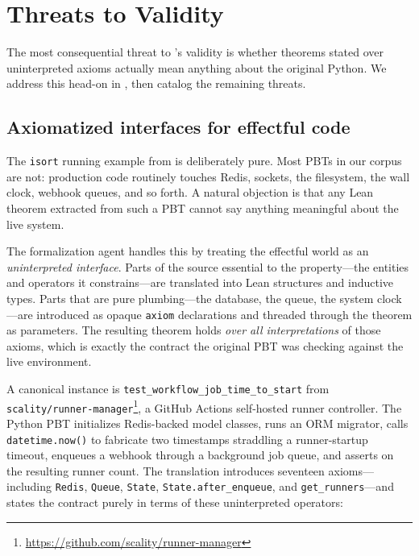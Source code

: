 \section{Threats to Validity}

The most consequential threat to \FVSpec's validity is whether theorems stated over uninterpreted axioms actually mean anything about the original Python. We address this head-on in , then catalog the remaining threats.

\subsection{Axiomatized interfaces for effectful code}
\label{sec:threats-axioms}

The \texttt{isort} running example from  is deliberately pure. Most PBTs in our corpus are not: production code routinely touches Redis, sockets, the filesystem, the wall clock, webhook queues, and so forth. A natural objection is that any Lean theorem extracted from such a PBT cannot say anything meaningful about the live system.

The formalization agent handles this by treating the effectful world as an \emph{uninterpreted interface}. Parts of the source essential to the property---the entities and operators it constrains---are translated into Lean structures and inductive types. Parts that are pure plumbing---the database, the queue, the system clock---are introduced as opaque \texttt{axiom} declarations and threaded through the theorem as parameters. The resulting theorem holds \emph{over all interpretations} of those axioms, which is exactly the contract the original PBT was checking against the live environment.

A canonical instance is \texttt{test\_workflow\_job\_time\_to\_start} from \texttt{scality/runner-manager}\footnote{\url{https://github.com/scality/runner-manager}}, a GitHub Actions self-hosted runner controller. The Python PBT initializes Redis-backed model classes, runs an ORM migrator, calls \texttt{datetime.now()} to fabricate two timestamps straddling a runner-startup timeout, enqueues a webhook through a background job queue, and asserts on the resulting runner count. The \FVSpec translation introduces seventeen axioms---including \texttt{Redis}, \texttt{Queue}, \texttt{State}, \texttt{State.after\_enqueue}, and \texttt{get\_runners}---and states the contract purely in terms of these uninterpreted operators:

